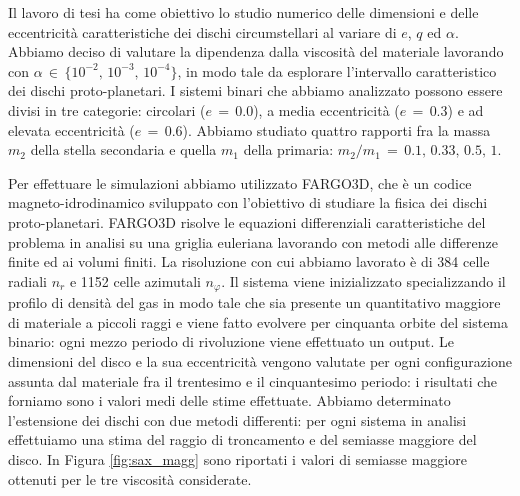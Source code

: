 \documentclass[12pt, a4paper]{report}
\begin{document}
Il lavoro di tesi ha come obiettivo lo studio numerico delle dimensioni e delle eccentricità caratteristiche dei dischi circumstellari al variare di $e$, $q$ ed $\alpha$. Abbiamo deciso di valutare la dipendenza dalla viscosità del materiale lavorando con $\alpha\,\in\,\{10^{-2},\, 10^{-3},\,10^{-4}\}$, in modo tale da esplorare l'intervallo caratteristico dei dischi proto-planetari.
I sistemi binari che abbiamo analizzato possono essere divisi in tre categorie: circolari ($e\,=\,0.0$), a media eccentricità ($e\,=\,0.3$) e ad elevata eccentricità ($e\,=\,0.6$).
Abbiamo studiato quattro rapporti fra la massa $m_2$ della stella secondaria e quella $m_1$ della primaria: $m_2/m_1\,=\,0.1,\,0.33,\,0.5,\,1$.

Per effettuare le simulazioni abbiamo utilizzato FARGO3D, che è un codice magneto-idrodinamico sviluppato con l'obiettivo di studiare la fisica dei dischi proto-planetari. FARGO3D risolve le equazioni differenziali caratteristiche del problema in analisi su una griglia euleriana lavorando con metodi alle differenze finite ed ai volumi finiti.
La risoluzione con cui abbiamo lavorato è di 384 celle radiali $n_r$ e 1152 celle azimutali $n_\varphi$. 
Il sistema viene inizializzato specializzando il profilo di densità del gas in modo tale che sia presente un quantitativo maggiore di materiale a piccoli raggi e viene fatto evolvere per cinquanta orbite del sistema binario: ogni mezzo periodo di rivoluzione viene effettuato un output.
Le dimensioni del disco e la sua eccentricità vengono valutate per ogni configurazione assunta dal materiale fra il trentesimo e il cinquantesimo periodo: i risultati che forniamo sono i valori medi delle stime effettuate. Abbiamo determinato l'estensione dei dischi con due metodi differenti: per ogni sistema in analisi effettuiamo una stima del raggio di troncamento e del semiasse maggiore del disco. In Figura \ref{fig:sax_magg} sono riportati i valori di semiasse maggiore ottenuti per le tre viscosità considerate.
\end{document}
